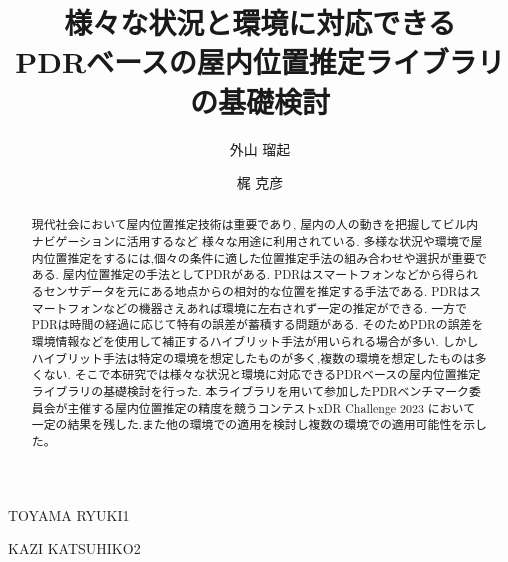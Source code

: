 \documentclass[Japanese]{dicomopapers}
\begin{document}
\title{様々な状況と環境に対応できる\\PDRベースの屋内位置推定ライブラリの基礎検討}



\author{外山 瑠起}{TOYAMA RYUKI}{1}
\author{梶 克彦}{KAZI KATSUHIKO}{2}



\begin{abstract}
	現代社会において屋内位置推定技術は重要であり,
	屋内の人の動きを把握してビル内ナビゲーションに活用するなど
	様々な用途に利用されている.
	多様な状況や環境で屋内位置推定をするには,個々の条件に適した位置推定手法の組み合わせや選択が重要である.
	屋内位置推定の手法としてPDRがある.
	PDRはスマートフォンなどから得られるセンサデータを元にある地点からの相対的な位置を推定する手法である.
	PDRはスマートフォンなどの機器さえあれば環境に左右されず一定の推定ができる.
	一方でPDRは時間の経過に応じて特有の誤差が蓄積する問題がある.
	そのためPDRの誤差を環境情報などを使用して補正するハイブリット手法が用いられる場合が多い.
	しかしハイブリット手法は特定の環境を想定したものが多く,複数の環境を想定したものは多くない.
	そこで本研究では様々な状況と環境に対応できるPDRベースの屋内位置推定ライブラリの基礎検討を行った.
	本ライブラリを用いて参加したPDRベンチマーク委員会が主催する屋内位置推定の精度を競うコンテストxDR Challenge 2023 において
	一定の結果を残した.また他の環境での適用を検討し複数の環境での適用可能性を示した。
\end{abstract}

\maketitle




















\end{document}
